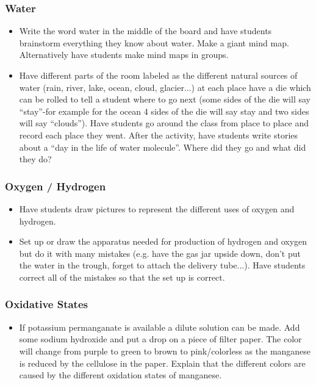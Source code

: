 \subsubsection{Water}
\begin{itemize}
\item	Write the word water in the middle of the board and have students brainstorm everything they know about water. Make a giant mind map. Alternatively have students make mind maps in groups.
\item Have different parts of the room labeled as the different natural sources of water (rain, river, lake, ocean, cloud, glacier...) at each place have a die which can be rolled to tell a student where to go next (some sides of the die will say ``stay''-for example for the ocean 4 sides of the die will say stay and two sides will say ``clouds''). Have students go around the class from place to place and record each place they went. After the activity, have students write stories about a ``day in the life of water molecule''. Where did they go and what did they do?
\end{itemize}

\subsubsection{Oxygen / Hydrogen}
\begin{itemize}
\item Have students draw pictures to represent the different uses of oxygen and hydrogen.
\item Set up or draw the apparatus needed for production of hydrogen and oxygen but do it with many mistakes (e.g. have the gas jar upside down, don't put the water in the trough, forget to attach the delivery tube...). Have students correct all of the mistakes so that the set up is correct.

\end{itemize}

\subsubsection{Oxidative States}
\begin{itemize}
\item	If potassium permanganate is available a dilute solution can be made. Add some sodium hydroxide and put a drop on a piece of filter paper. The color will change from purple to green to brown to pink/colorless as the manganese is reduced by the cellulose in the paper. Explain that the different colors are caused by the different oxidation states of manganese.
\end{itemize}

